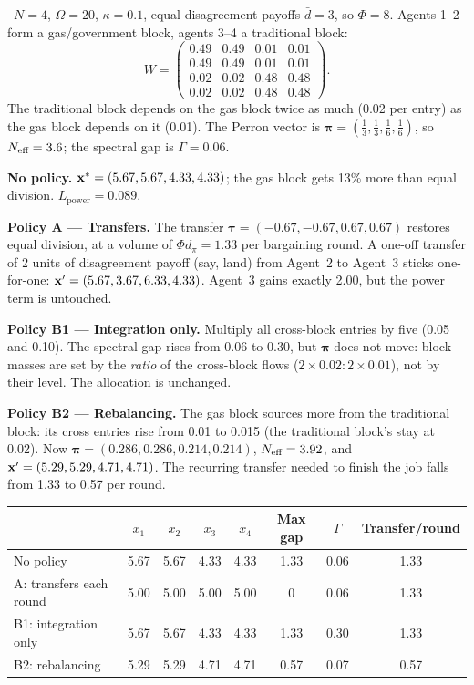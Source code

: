 \documentclass[../structural_economics_book.tex]{subfiles}
\begin{document}
\begin{example}\label{ch02:ex:transfer_vs_structural}
\illustrative\ $N = 4$, $\Omega = 20$, $\kappa = 0.1$, equal disagreement payoffs $\bar d = 3$, so $\Phi = 8$. Agents 1--2 form a gas/government block, agents 3--4 a traditional block:
\begin{equation*}
W = \begin{pmatrix} 0.49 & 0.49 & 0.01 & 0.01 \\ 0.49 & 0.49 & 0.01 & 0.01 \\ 0.02 & 0.02 & 0.48 & 0.48 \\ 0.02 & 0.02 & 0.48 & 0.48 \end{pmatrix}.
\end{equation*}
The traditional block depends on the gas block twice as much (0.02 per entry) as the gas block depends on it (0.01). The Perron vector is $\boldsymbol{\pi} = (\frac13, \frac13, \frac16, \frac16)$, so $N_{\text{eff}} = 3.6$; the spectral gap is $\Gamma = 0.06$.

\textbf{No policy.} $\mathbf{x}^* = (5.67, 5.67, 4.33, 4.33)$; the gas block gets 13\% more than equal division. $L_{\text{power}} = 0.089$.

\textbf{Policy A --- Transfers.} The transfer $\boldsymbol{\tau} = (-0.67, -0.67, 0.67, 0.67)$ restores equal division, at a volume of $\Phi d_\pi = 1.33$ per bargaining round. A one-off transfer of 2 units of disagreement payoff (say, land) from Agent~2 to Agent~3 sticks one-for-one: $\mathbf{x}' = (5.67, 3.67, 6.33, 4.33)$. Agent~3 gains exactly 2.00, but the power term is untouched.

\textbf{Policy B1 --- Integration only.} Multiply all cross-block entries by five (0.05 and 0.10). The spectral gap rises from 0.06 to 0.30, but $\boldsymbol{\pi}$ does not move: block masses are set by the \textit{ratio} of the cross-block flows ($2 \times 0.02 : 2 \times 0.01$), not by their level. The allocation is unchanged.

\textbf{Policy B2 --- Rebalancing.} The gas block sources more from the traditional block: its cross entries rise from 0.01 to 0.015 (the traditional block's stay at 0.02). Now $\boldsymbol{\pi} = (0.286, 0.286, 0.214, 0.214)$, $N_{\text{eff}} = 3.92$, and $\mathbf{x}' = (5.29, 5.29, 4.71, 4.71)$. The recurring transfer needed to finish the job falls from 1.33 to 0.57 per round.

\begin{center}
\begin{tabular}{lcccc|ccc}
\toprule
& $x_1$ & $x_2$ & $x_3$ & $x_4$ & Max gap & $\Gamma$ & Transfer/round \\
\midrule
No policy & 5.67 & 5.67 & 4.33 & 4.33 & 1.33 & 0.06 & 1.33 \\
A: transfers each round & 5.00 & 5.00 & 5.00 & 5.00 & 0 & 0.06 & 1.33 \\
B1: integration only & 5.67 & 5.67 & 4.33 & 4.33 & 1.33 & 0.30 & 1.33 \\
B2: rebalancing & 5.29 & 5.29 & 4.71 & 4.71 & 0.57 & 0.07 & 0.57 \\
\bottomrule
\end{tabular}
\end{center}


\end{example}
\end{document}
